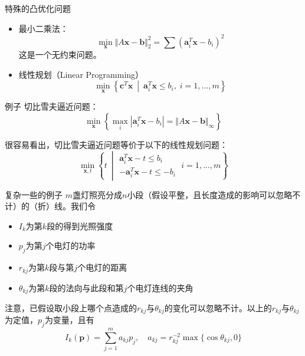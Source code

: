 
\begin{frame}

\begin{block}{特殊的凸优化问题}
\begin{itemize}
\item 最小二乘法：
\[\min\limits_{\mathbf{x}} \Vert A\mathbf{x} - \mathbf{b} \Vert_2^2 = \sum (\mathbf{a}_i^T\mathbf{x} - b_i)^2\]
这是一个无约束问题。
\item 线性规划（Linear Programming）
\[\min\limits_{\mathbf{x}} \left\{ \mathbf{c}^T\mathbf{x} \ \middle|\ \mathbf{a}_i^T\mathbf{x} \le b_i, \; i = 1,\ldots,m \right\}\]
\end{itemize}
\end{block}

\end{frame}


\begin{frame}

\begin{block}{例子}
切比雪夫逼近问题：
\[\min\limits_{\mathbf{x}} \left\{ \max\limits_i |\mathbf{a}_i^T\mathbf{x}-b_i| = \Vert A\mathbf{x} - \mathbf{b} \Vert_{\infty} \right\}\]

\vspace{1em}
\pause

很容易看出，切比雪夫逼近问题等价于以下的线性规划问题：
\[\min\limits_{\mathbf{x},t} \left\{ t \ \middle| \begin{array}{c}
\mathbf{a}_i^T\mathbf{x} - t \le b_i \\
-\mathbf{a}_i^T\mathbf{x} - t \le -b_i
\end{array}\; i = 1,\ldots,m \right\}\]
\end{block}

\end{frame}


\begin{frame}

\begin{block}{复杂一些的例子}
$m$盏灯照亮分成$n$小段（假设平整，且长度造成的影响可以忽略不计）的（折）线。我们令
\begin{itemize}
\item $I_k$为第$k$段的得到光照强度
\item $p_j$为第$j$个电灯的功率
\item $r_{kj}$为第$k$段与第$j$个电灯的距离
\item $\theta_{kj}$为第$k$段的法向与此段和第$j$个电灯连线的夹角
\end{itemize}
注意，已假设取小段上哪个点造成的$r_{kj}$与$\theta_{kj}$的变化可以忽略不计。以上的$r_{kj}$与$\theta_{kj}$为定值，$p_j$为变量，且有
\[I_k(\mathbf{p}) = \sum\limits_{j=1}^m a_{kj} p_j, \quad a_{kj} = r_{kj}^{-2} \max \{ \cos \theta_{kj}, 0 \}\]
\end{block}

\end{frame}


